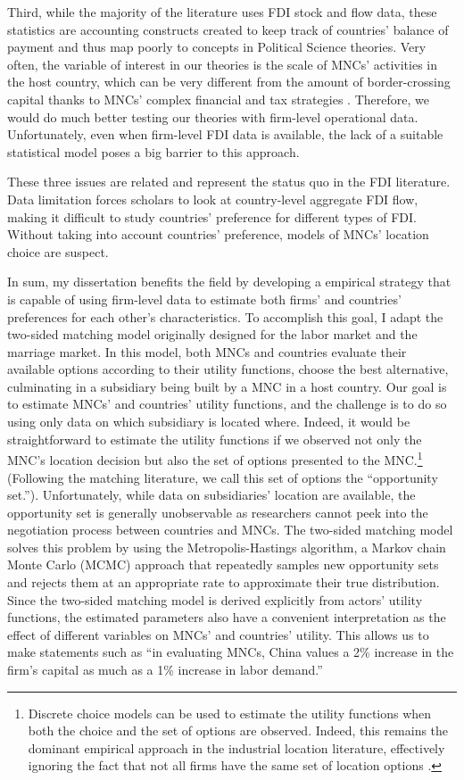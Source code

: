 Third, while the majority of the literature uses FDI stock
and flow data, these statistics are accounting constructs created to keep track
of countries' balance of payment and thus map poorly to concepts in Political
Science theories. Very often, the variable of interest in our theories is the scale of MNCs'
activities in the host country, which can be very different from the amount of
border-crossing capital thanks to MNCs' complex financial and tax strategies
\citep{Kerner2014}. Therefore, we would do much better testing our theories with
firm-level operational data. Unfortunately, even when firm-level FDI data is
available, the lack of a suitable statistical model poses a big barrier to this approach.

These three issues are related and represent the status quo in the FDI
literature. Data limitation forces scholars to look at country-level aggregate
FDI flow, making it difficult to study countries' preference for different types
of FDI. Without taking into account countries' preference, models of MNCs'
location choice are suspect.

In sum, my dissertation benefits the field by developing a empirical strategy that is capable of using firm-level data to estimate both firms' and countries' preferences for
each other's characteristics. To accomplish this goal, I adapt the two-sided
matching model originally designed for the labor market and the marriage market.
In this model, both MNCs and countries evaluate their available options
according to their utility functions, choose the best alternative, culminating
in a subsidiary being built by a MNC in a host country. Our goal is to estimate
MNCs' and countries' utility functions, and the challenge is to do so using only
data on which subsidiary is located where. Indeed, it would be straightforward
to estimate the utility functions if we observed not only the MNC's location decision
but also the set of options presented to the MNC.\footnote{Discrete choice
  models can be used to estimate the utility functions when both the choice and the set of options are observed.
  Indeed, this remains the dominant empirical approach in the industrial location
  literature, effectively ignoring the fact that not all firms have the same set
  of location options \citep{Arauzo-Carod2010}.} (Following the matching
literature, we call this set of options
the ``opportunity set.''). Unfortunately, while data on
subsidiaries' location are available, the opportunity set is generally
unobservable as researchers cannot peek into the negotiation process between
countries and MNCs. The two-sided matching model solves this problem by
using the Metropolis-Hastings algorithm, a Markov chain Monte Carlo (MCMC)
approach that repeatedly samples new opportunity sets and rejects them at an
appropriate rate to approximate their true distribution. Since the two-sided
matching model is derived explicitly from actors' utility functions, the
estimated parameters also have a convenient interpretation as the effect of different
variables on MNCs' and countries' utility. This allows us to make statements
such as ``in evaluating MNCs, China values a 2\% increase in the firm's capital as much as
a 1\% increase in labor demand.''

